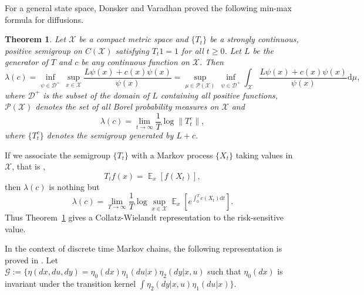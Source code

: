 \documentclass[notitlepage,11pt,reqno]{amsart}
\numberwithin{equation}{section}
\theoremstyle{plain}
\newtheorem{theorem}{Theorem}[section]
\theoremstyle{definition}
\theoremstyle{remark}
\newcommand{\sD}{{\mathscr{D}}}
\newcommand{\cG}{{\mathcal{G}}}     %
\newcommand{\Pm}{{\mathcal{P}}}     %
\newcommand{\cX}{{\mathcal{X}}}
\DeclareMathOperator{\Exp}{\mathbb{E}} %
\newcommand{\D}{\mathrm{d}} %
\newcommand{\norm}[1]{\lVert#1\rVert}
\begin{document}
For a general state space, Donsker and Varadhan \cite{MR361998} proved the following min-max formula for diffusions.
\begin{theorem}\label{T3.10}
Let $\cX$ be a compact metric space and $\{T_t\}$ be a strongly continuous, positive semigroup on $C(\cX)$ satisfying $T_t 1=1$ for all $t\geq 0$. Let $L$ be the generator
of $T$ and $c$ be any continuous function on $\cX$. Then
\begin{equation}\label{ET3.10A}
\lambda(c)=\inf_{\psi\in \sD^+}\, \sup_{x\in\cX}\frac{L\psi(x) + c(x)\psi(x)}{\psi(x)}=\sup_{\mu\in\Pm(\cX)}\,\inf_{\psi\in\sD^+}\int_{\cX}\frac{L\psi(x) + c(x)\psi(x)}{\psi(x)}\D\mu,
\end{equation}
where $\sD^+$ is the subset of the domain of $L$ containing all positive functions, $\Pm(\cX)$ denotes the set of all Borel probability measures on $\cX$ and
$$\lambda(c)=\lim_{t\to\infty} \frac{1}{T}\log \norm{T^c_t},$$
where $\{T^c_t\}$ denotes the semigroup generated by $L+c$.
\end{theorem}
If we associate the semigroup $\{T_t\}$ with a Markov process $\{X_t\}$ taking values in $\cX$, that is ,
$$T_t f(x) =\Exp_x[f(X_t)],$$
then $\lambda(c)$ is nothing but 
$$\lambda(c)=\lim_{T\to\infty} \frac{1}{T}\log \sup_{x\in\cX}\Exp_x\left[e^{\int_0^T c(X_t)\D{t}}\right].$$
Thus Theorem~\ref{T3.10} gives a Collatz-Wielandt representation to the risk-sensitive value. 

In the context of discrete time Markov chains, the following representation is proved 
in \cite[Theorem~2.2]{MR3629428}. Let\\

\noindent $\cG := \{\eta(dx, du, dy) = \eta_0(dx)\eta_1(du|x)\eta_2(dy|x,u)$ such that $\eta_0(dx)$ is invariant under the transition kernel $\int\eta_2(dy|x,u)\eta_1(du|x)\}$.
\end{document}

